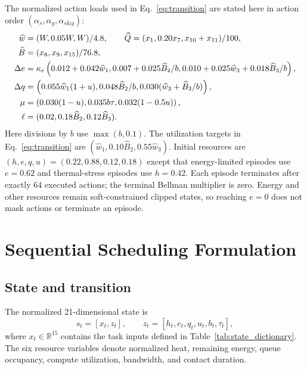 \documentclass[11pt]{article}
\newcommand{\R}{\mathbb{R}}
\begin{document}
{The normalized action loads used in Eq.~\eqref{eq:transition} are stated here in action order $(\alpha_s,\alpha_g,\alpha_{s\&g})$:
\begin{align}
\widehat w&=(W,0.05W,W)/4.8,\qquad
\widehat Q=(x_1,0.20x_7,x_{10}+x_{11})/100,\notag\\
\widehat B&=(x_6,x_9,x_{15})/76.8,\notag\\
\Delta e&=\kappa_e\left(0.012+0.042\widehat w_1,
0.007+0.025\widehat B_2/b,
0.010+0.025\widehat w_3+0.018\widehat B_3/b\right),\notag\\
\Delta q&=\left(0.055\widehat w_1(1+u),
0.048\widehat B_2/b,
0.030(\widehat w_3+\widehat B_3/b)\right),\notag\\
\mu&=\left(0.030(1-u),0.035b\tau,0.032(1-0.5u)\right),\notag\\
\ell&=(0.02,0.18\widehat B_2,0.12\widehat B_3).
\label{eq:action_loads}
\end{align}
Here divisions by $b$ use $\max(b,0.1)$. The utilization targets in Eq.~\eqref{eq:transition} are $(\widehat w_1,0.10\widehat B_2,0.55\widehat w_3)$. Initial resources are $(h,e,q,u)=(0.22,0.88,0.12,0.18)$ except that energy-limited episodes use $e=0.62$ and thermal-stress episodes use $h=0.42$. Each episode terminates after exactly 64 executed actions; the terminal Bellman multiplier is zero. Energy and other resources remain soft-constrained clipped states, so reaching $e=0$ does not mask actions or terminate an episode.

}%
\section{Sequential Scheduling Formulation}
\label{sec:mdp}

\subsection{State and transition}

The normalized 21-dimensional state is
\begin{equation}
s_t=[x_t,z_t],\qquad z_t=[h_t,e_t,q_t,u_t,b_t,\tau_t],
\end{equation}
where $x_t\in\R^{15}$ contains the task inputs defined in Table~\ref{tab:state_dictionary}. The six resource variables denote normalized heat, remaining energy, queue occupancy, compute utilization, bandwidth, and contact duration.
\end{document}
